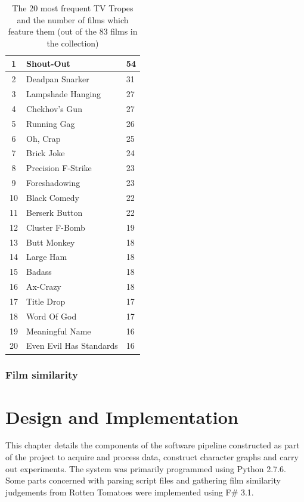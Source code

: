 \documentclass[bsc,frontabs,singlespacing,parskip]{infthesis} %
\begin{document}
\begin{table}[!htb]
\centering
\begin{tabular}{|c||l|l|}
\hline
1 & Shout-Out & 54 \\ \hline
2 & Deadpan Snarker & 31 \\ \hline
3 & Lampshade Hanging & 27 \\ \hline
4 & Chekhov's Gun & 27 \\ \hline
5 & Running Gag & 26 \\ \hline
6 & Oh, Crap & 25 \\ \hline
7 & Brick Joke & 24 \\ \hline
8 & Precision F-Strike & 23 \\ \hline
9 & Foreshadowing & 23 \\ \hline
10 & Black Comedy & 22 \\ \hline
11 & Berserk Button & 22 \\ \hline
12 & Cluster F-Bomb & 19 \\ \hline
13 & Butt Monkey & 18 \\ \hline
14 & Large Ham & 18 \\ \hline
15 & Badass & 18 \\ \hline
16 & Ax-Crazy & 18 \\ \hline
17 & Title Drop & 17 \\ \hline
18 & Word Of God & 17 \\ \hline
19 & Meaningful Name & 16 \\ \hline
20 & Even Evil Has Standards & 16 \\ \hline

\end{tabular}

\caption{The 20 most frequent TV Tropes and the number of films which feature them (out of the 83 films in the collection)}

\end{table}
\subsection{Film similarity}

\chapter{Design and Implementation}

This chapter details the components of the software pipeline constructed as part of the project to acquire and process data, construct character graphs and carry out experiments. The system was primarily programmed using Python 2.7.6. Some parts concerned with parsing script files and gathering film similarity judgements from Rotten Tomatoes were implemented using F\# 3.1.
\end{document}
